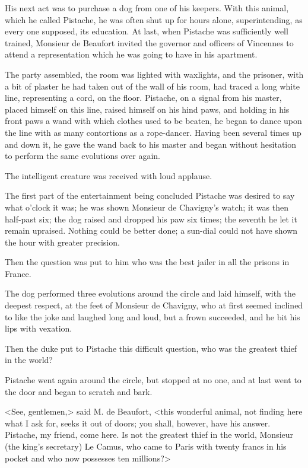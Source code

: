 His next act was to purchase a dog from one of his keepers. With this animal, which he called Pistache, he was often shut up for hours alone, superintending, as every one supposed, its education. At last, when Pistache was sufficiently well trained, Monsieur de Beaufort invited the governor and officers of Vincennes to attend a representation which he was going to have in his apartment.

The party assembled, the room was lighted with waxlights, and the prisoner, with a bit of plaster he had taken out of the wall of his room, had traced a long white line, representing a cord, on the floor. Pistache, on a signal from his master, placed himself on this line, raised himself on his hind paws, and holding in his front paws a wand with which clothes used to be beaten, he began to dance upon the line with as many contortions as a rope-dancer. Having been several times up and down it, he gave the wand back to his master and began without hesitation to perform the same evolutions over again.

The intelligent creature was received with loud applause.

The first part of the entertainment being concluded Pistache was desired to say what o'clock it was; he was shown Monsieur de Chavigny's watch; it was then half-past six; the dog raised and dropped his paw six times; the seventh he let it remain upraised. Nothing could be better done; a sun-dial could not have shown the hour with greater precision.

Then the question was put to him who was the best jailer in all the prisons in France.

The dog performed three evolutions around the circle and laid himself, with the deepest respect, at the feet of Monsieur de Chavigny, who at first seemed inclined to like the joke and laughed long and loud, but a frown succeeded, and he bit his lips with vexation.

Then the duke put to Pistache this difficult question, who was the greatest thief in the world?

Pistache went again around the circle, but stopped at no one, and at last went to the door and began to scratch and bark.

<See, gentlemen,> said M. de Beaufort, <this wonderful animal, not finding here what I ask for, seeks it out of doors; you shall, however, have his answer. Pistache, my friend, come here. Is not the greatest thief in the world, Monsieur (the king's secretary) Le Camus, who came to Paris with twenty francs in his pocket and who now possesses ten millions?>

